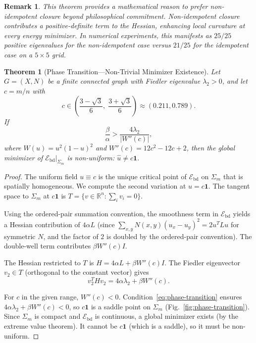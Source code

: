 \documentclass[lettersize,journal]{IEEEtran}
\newtheorem{theorem}{Theorem}
\newtheorem{remark}{Remark}
\begin{document}
\begin{remark}
This theorem provides a \emph{mathematical} reason to prefer non-idempotent closure beyond philosophical commitment. Non-idempotent closure contributes a positive-definite term to the Hessian, enhancing local curvature at every energy minimizer. In numerical experiments, this manifests as $25/25$ positive eigenvalues for the non-idempotent case versus $21/25$ for the idempotent case on a $5 \times 5$ grid.
\end{remark}

\begin{theorem}[Phase Transition---Non-Trivial Minimizer Existence]
\label{thm:phase-transition}
Let $G = (X, N)$ be a finite connected graph with Fiedler eigenvalue $\lambda_2 > 0$, and let $c = m/n$ with
\begin{equation}
c \in \left(\frac{3 - \sqrt{3}}{6},\; \frac{3 + \sqrt{3}}{6}\right) \approx (0.211, 0.789).
\end{equation}
If
\begin{equation}
\label{eq:phase-transition}
\frac{\beta}{\alpha} > \frac{4\lambda_2}{|W''(c)|},
\end{equation}
where $W(u) = u^2(1-u)^2$ and $W''(c) = 12c^2 - 12c + 2$, then the global minimizer of $\mathcal{E}_{\mathrm{bd}}|_{\Sigma_m}$ is non-uniform: $\hat{u} \neq c\mathbf{1}$.
\end{theorem}

\begin{proof}
The uniform field $u \equiv c$ is the unique critical point of $\mathcal{E}_{\mathrm{bd}}$ on $\Sigma_m$ that is spatially homogeneous. We compute the second variation at $u = c\mathbf{1}$. The tangent space to $\Sigma_m$ at $c\mathbf{1}$ is $T = \{v \in \mathbb{R}^n : \sum_i v_i = 0\}$.

Using the ordered-pair summation convention, the smoothness term in $\mathcal{E}_{\mathrm{bd}}$ yields a Hessian contribution of $4\alpha L$ (since $\sum_{x,y} N(x,y)(u_x - u_y)^2 = 2u^T L u$ for symmetric $N$, and the factor of $2$ is doubled by the ordered-pair convention). The double-well term contributes $\beta W''(c) I$.

The Hessian restricted to $T$ is $H = 4\alpha L + \beta W''(c) I$. The Fiedler eigenvector $v_2 \in T$ (orthogonal to the constant vector) gives
\begin{equation}
v_2^T H v_2 = 4\alpha\lambda_2 + \beta W''(c).
\end{equation}

For $c$ in the given range, $W''(c) < 0$. Condition~\eqref{eq:phase-transition} ensures $4\alpha\lambda_2 + \beta W''(c) < 0$, so $c\mathbf{1}$ is a saddle point on $\Sigma_m$ (Fig.~\ref{fig:phase-transition}). Since $\Sigma_m$ is compact and $\mathcal{E}_{\mathrm{bd}}$ is continuous, a global minimizer exists (by the extreme value theorem). It cannot be $c\mathbf{1}$ (which is a saddle), so it must be non-uniform.
\end{proof}
\end{document}
